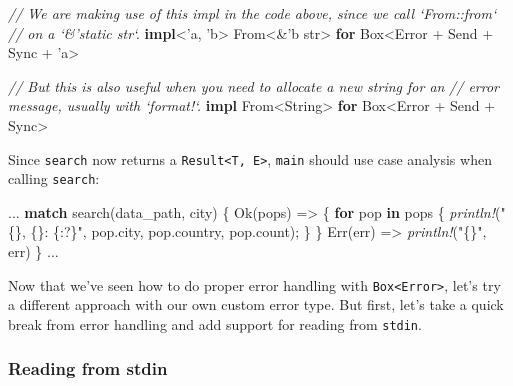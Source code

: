 \documentclass[a4paper,]{book}
\newenvironment{Shaded}{\begin{snugshade}}{\end{snugshade}}
\newcommand{\KeywordTok}[1]{\textcolor[rgb]{0.13,0.29,0.53}{\textbf{{#1}}}}
\newcommand{\DataTypeTok}[1]{\textcolor[rgb]{0.13,0.29,0.53}{{#1}}}
\newcommand{\ConstantTok}[1]{\textcolor[rgb]{0.00,0.00,0.00}{{#1}}}
\newcommand{\StringTok}[1]{\textcolor[rgb]{0.31,0.60,0.02}{{#1}}}
\newcommand{\CommentTok}[1]{\textcolor[rgb]{0.56,0.35,0.01}{\textit{{#1}}}}
\newcommand{\OtherTok}[1]{\textcolor[rgb]{0.56,0.35,0.01}{{#1}}}
\newcommand{\BuiltInTok}[1]{{#1}}
\newcommand{\PreprocessorTok}[1]{\textcolor[rgb]{0.56,0.35,0.01}{\textit{{#1}}}}
\newcommand{\NormalTok}[1]{{#1}}
\begin{document}
\begin{Shaded}
\begin{Highlighting}[]
\CommentTok{// We are making use of this impl in the code above, since we call `From::from`}
\CommentTok{// on a `&'static str`.}
\KeywordTok{impl}\NormalTok{<}\OtherTok{'a}\NormalTok{, }\OtherTok{'b}\NormalTok{> From<&}\OtherTok{'b} \DataTypeTok{str}\NormalTok{> }\KeywordTok{for} \DataTypeTok{Box}\NormalTok{<Error + }\BuiltInTok{Send} \NormalTok{+ }\BuiltInTok{Sync} \NormalTok{+ }\OtherTok{'a}\NormalTok{>}

\CommentTok{// But this is also useful when you need to allocate a new string for an}
\CommentTok{// error message, usually with `format!`.}
\KeywordTok{impl} \NormalTok{From<}\DataTypeTok{String}\NormalTok{> }\KeywordTok{for} \DataTypeTok{Box}\NormalTok{<Error + }\BuiltInTok{Send} \NormalTok{+ }\BuiltInTok{Sync}\NormalTok{>}
\end{Highlighting}
\end{Shaded}

Since \texttt{search} now returns a
\texttt{Result\textless{}T,\ E\textgreater{}}, \texttt{main} should use
case analysis when calling \texttt{search}:

\begin{Shaded}
\begin{Highlighting}[]
\NormalTok{...}
    \KeywordTok{match} \NormalTok{search(data_path, city) \{}
        \ConstantTok{Ok}\NormalTok{(pops) => \{}
            \KeywordTok{for} \NormalTok{pop }\KeywordTok{in} \NormalTok{pops \{}
                \PreprocessorTok{println!}\NormalTok{(}\StringTok{"\{\}, \{\}: \{:?\}"}\NormalTok{, pop.city, pop.country, pop.count);}
            \NormalTok{\}}
        \NormalTok{\}}
        \ConstantTok{Err}\NormalTok{(err) => }\PreprocessorTok{println!}\NormalTok{(}\StringTok{"\{\}"}\NormalTok{, err)}
    \NormalTok{\}}
\NormalTok{...}
\end{Highlighting}
\end{Shaded}

Now that we've seen how to do proper error handling with
\texttt{Box\textless{}Error\textgreater{}}, let's try a different
approach with our own custom error type. But first, let's take a quick
break from error handling and add support for reading from
\texttt{stdin}.

\hypertarget{reading-from-stdin}{\subsubsection{Reading from
stdin}\label{reading-from-stdin}}
\end{document}
